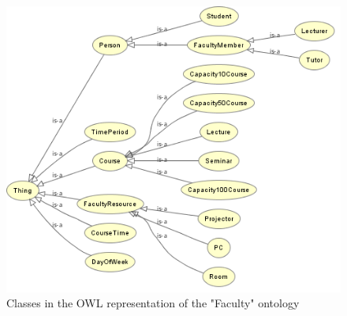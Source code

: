 \documentclass[10pt,a4paper]{article}
\begin{document}
\begin{enumerate}
\begin{enumerate}
\begin{figure}[H]
  \caption{Classes in the OWL representation of the "Faculty" ontology}
  \centering
    \includegraphics[scale=0.7]{owl_graph.png}
\end{figure}


\end{enumerate}

\end{enumerate}
\end{document}

